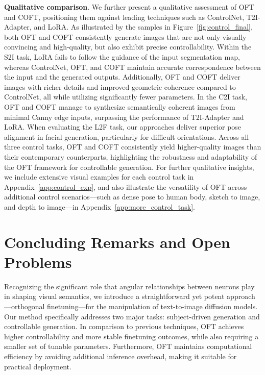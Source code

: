 \textbf{Qualitative comparison}. We further present a qualitative assessment of OFT and COFT, positioning them against leading techniques such as ControlNet, T2I-Adapter, and LoRA. As illustrated by the samples in Figure~\ref{fig:control_final}, both OFT and COFT consistently generate images that are not only visually convincing and high-quality, but also exhibit precise controllability. Within the S2I task, LoRA fails to follow the guidance of the input segmentation map, whereas ControlNet, OFT, and COFT maintain accurate correspondence between the input and the generated outputs. Additionally, OFT and COFT deliver images with richer details and improved geometric coherence compared to ControlNet, all while utilizing significantly fewer parameters. In the C2I task, OFT and COFT manage to synthesize semantically coherent images from minimal Canny edge inputs, surpassing the performance of T2I-Adapter and LoRA. When evaluating the L2F task, our approaches deliver superior pose alignment in facial generation, particularly for difficult orientations. Across all three control tasks, OFT and COFT consistently yield higher-quality images than their contemporary counterparts, highlighting the robustness and adaptability of the OFT framework for controllable generation. For further qualitative insights, we include extensive visual examples for each control task in Appendix~\ref{app:control_exp}, and also illustrate the versatility of OFT across additional control scenarios—such as dense pose to human body, sketch to image, and depth to image—in Appendix~\ref{app:more_control_task}.

\section{Concluding Remarks and Open Problems}

Recognizing the significant role that angular relationships between neurons play in shaping visual semantics, we introduce a straightforward yet potent approach—orthogonal finetuning—for the manipulation of text-to-image diffusion models. Our method specifically addresses two major tasks: subject-driven generation and controllable generation. In comparison to previous techniques, OFT achieves higher controllability and more stable finetuning outcomes, while also requiring a smaller set of tunable parameters. Furthermore, OFT maintains computational efficiency by avoiding additional inference overhead, making it suitable for practical deployment.

